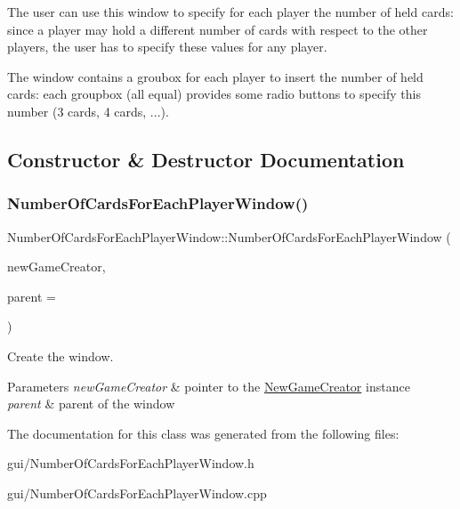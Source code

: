 The user can use this window to specify for each player the number of held cards\+: since a player may hold a different number of cards with respect to the other players, the user has to specify these values for any player.

The window contains a groubox for each player to insert the number of held cards\+: each groupbox (all equal) provides some radio buttons to specify this number (3 cards, 4 cards, ...). 

\subsection{Constructor \& Destructor Documentation}
\mbox{\label{classNumberOfCardsForEachPlayerWindow_aadd6710e807d6ac5a401c1ecbe51792b}} 
\subsubsection{\texorpdfstring{Number\+Of\+Cards\+For\+Each\+Player\+Window()}{NumberOfCardsForEachPlayerWindow()}}
{\footnotesize\ttfamily Number\+Of\+Cards\+For\+Each\+Player\+Window\+::\+Number\+Of\+Cards\+For\+Each\+Player\+Window (\begin{DoxyParamCaption}\item[{\hyperlink{classNewGameCreator}{New\+Game\+Creator} $\ast$}]{new\+Game\+Creator,  }\item[{Q\+Widget $\ast$}]{parent = {} }\end{DoxyParamCaption})}



Create the window. 


\begin{DoxyParams}{Parameters}
{\em new\+Game\+Creator} & pointer to the \hyperlink{classNewGameCreator}{New\+Game\+Creator} instance \\
\hline
{\em parent} & parent of the window \\
\hline
\end{DoxyParams}


The documentation for this class was generated from the following files\+:\begin{DoxyCompactItemize}
\item 
gui/Number\+Of\+Cards\+For\+Each\+Player\+Window.\+h\item 
gui/Number\+Of\+Cards\+For\+Each\+Player\+Window.\+cpp\end{DoxyCompactItemize}
